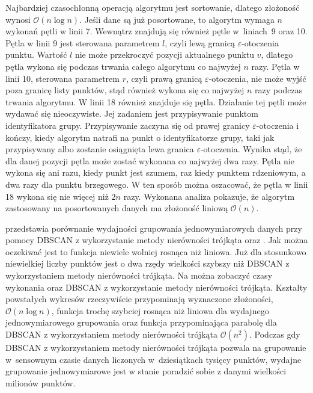 Najbardziej czasochłonną operacją algorytmu jest sortowanie, dlatego złożoność wynosi $ \mathcal{O}(n\log{}n) $. Jeśli dane są już posortowane, to algorytm wymaga $ n $ wykonań pętli w linii 7. Wewnątrz znajdują się również pętle \mbox{w liniach 9} oraz 10. Pętla w linii 9 jest sterowana parametrem $ l $, czyli lewą granicą $ \varepsilon $-otoczenia punktu. Wartość $ l $ nie może przekroczyć pozycji aktualnego punktu $ v $, dlatego pętla wykona się podczas trwania całego algorytmu co najwyżej $ n $ razy. Pętla w linii 10, sterowana parametrem $ r $, czyli prawą granicą $ \varepsilon $-otoczenia, nie może wyjść poza granicę listy punktów, stąd również wykona się co najwyżej $ n $ razy podczas trwania algorytmu. W linii 18 również znajduje się pętla. Działanie tej pętli może wydawać się nieoczywiste. Jej zadaniem jest przypisywanie punktom identyfikatora grupy. Przypisywanie zaczyna się od prawej granicy $ \varepsilon $-otoczenia i kończy, kiedy algorytm natrafi na punkt o identyfikatorze grupy, taki jak przypisywany albo zostanie osiągnięta lewa granica $ \varepsilon $-otoczenia. Wynika stąd, że dla danej pozycji pętla może zostać wykonana co najwyżej dwa razy. Pętla nie wykona się ani razu, kiedy punkt jest szumem, raz kiedy punktem rdzeniowym, a dwa razy dla punktu brzegowego. W ten sposób można oszacować, że pętla w linii 18 wykona się nie więcej niż $ 2n $ razy. Wykonana analiza pokazuje, że algorytm zastosowany na posortowanych danych ma złożoność liniową $ \mathcal{O}(n). $\par



 przedstawia porównanie wydajności grupowania jednowymiarowych danych przy pomocy DBSCAN z wykorzystanie metody nierówności trójkąta oraz . Jak można oczekiwać jest to funkcja niewiele wolniej rosnąca niż liniowa. Już dla stosunkowo niewielkiej liczby punktów  jest o dwa rzędy wielkości szybszy niż DBSCAN z wykorzystaniem metody nierówności trójkąta. Na  można zobaczyć czasy wykonania  oraz DBSCAN z wykorzystanie metody nierówności trójkąta. Kształty powstałych wykresów rzeczywiście przypominają wyznaczone złożoności, $ \mathcal{O}(n\log{}n) $, funkcja trochę szybciej rosnąca niż liniowa dla wydajnego jednowymiarowego grupowania oraz funkcja przypominająca parabolę dla DBSCAN z wykorzystaniem metody nierówności trójkąta $ \mathcal{O}(n^2) $. Podczas gdy DBSCAN z wykorzystaniem metody nierówności trójkąta pozwala na grupowanie \mbox{w s}en\-sownym czasie danych liczonych \mbox{w d}ziesiątkach tysięcy punktów, wydajne grupowanie jednowymiarowe jest w stanie poradzić sobie z danymi wielkości milionów punktów.\par

